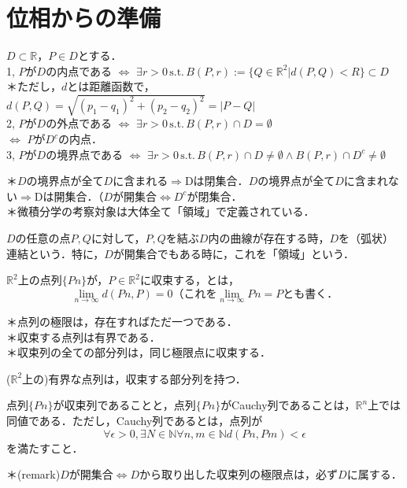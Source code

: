 \documentclass[uplatex, dvipdfmx]{jsreport}
\begin{document}
\section{位相からの準備}
\begin{shadebox}\begin{definition}$D \subset \mathbb{R}$，$P \in D$とする．\\
1, $P$が$D$の内点である $\Longleftrightarrow$ $\exists r>0 \, \mathrm{s.t.} \, B(P,r):=\{ Q \in \mathbb{R}^2 | d(P,Q)<R \} \subset D$ \\
\noindent
＊ただし，$d$とは距離函数で，$d(P,Q)=\sqrt{(p_1-q_1)^2 + (p_2-q_2)^2}=|P-Q|$\\
2, $P$が$D$の外点である $\Longleftrightarrow$ $\exists r>0 \, \mathrm{s.t.} \, B(P,r) \cap D=\emptyset$ \\
$\Longleftrightarrow$ $P$が$D^c$の内点．\\
3, $P$が$D$の境界点である $\Longleftrightarrow$ $\exists r>0 \, \mathrm{s.t.} \, B(P,r) \cap D\neq \emptyset \land B(P,r) \cap D^c \neq \emptyset$ 
\end{definition}\end{shadebox}
\noindent
＊$D$の境界点が全て$D$に含まれる$\Longrightarrow$Dは閉集合．$D$の境界点が全て$D$に含まれない$\Longrightarrow$Dは開集合．（$D$が開集合$\Longleftrightarrow D^c$が閉集合．\\
＊微積分学の考察対象は大体全て「領域」で定義されている．

\begin{shadebox}\begin{definition}[連結・領域]$D$の任意の点$P,Q$に対して，$P,Q$を結ぶ$D$内の曲線が存在する時，$D$を（弧状）連結という．特に，$D$が開集合でもある時に，これを「領域」という．
\end{definition}\end{shadebox}

\begin{shadebox}\begin{definition}[点列]$\mathbb{R}^2$上の点列$\{Pn\}$が，$P\in \mathbb{R}^2$に収束する，とは，$$\lim_{n\to \infty} d(Pn,P)=0 \mathrm{（これを} \lim_{n\to \infty} Pn=P \mathrm{とも書く．} $$
\end{definition}\end{shadebox}
\noindent
＊点列の極限は，存在すればただ一つである．\\
＊収束する点列は有界である．\\
＊収束列の全ての部分列は，同じ極限点に収束する．
\begin{theorem}($\mathbb{R}^2$上の)有界な点列は，収束する部分列を持つ．\end{theorem}
\begin{theorem}[Cauchy列は収束する]点列$\{ Pn \}$が収束列であることと，点列$\{ Pn \}$がCauchy列であることは，$\mathbb{R}^n$上では同値である．ただし，Cauchy列であるとは，点列が$$\forall \epsilon >0, \exists N \in \mathbb{N} \forall n,m \in \mathbb{N} d(Pn,Pm)<\epsilon $$を満たすこと． \end{theorem}
\noindent
＊(remark)$D$が開集合$\Longleftrightarrow D$から取り出した収束列の極限点は，必ず$D$に属する．
\end{document}
